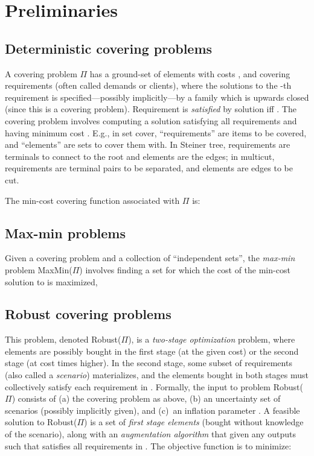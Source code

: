 \documentclass[11pt,letterpaper]{article}
\def\cov{\ensuremath{\Pi}\xspace}
\def\rcov{{\sf Robust(\cov)}\xspace}
\def\mmp{{\sf MaxMin(\cov)}\xspace}
\newcounter{note}[section]
\begin{document}
\section{Preliminaries}
\label{sec:prelim}

\subsection{Deterministic covering problems}

A covering problem \cov has a ground-set  of elements with costs , and  covering
requirements (often called demands or clients), where the solutions to the -th requirement is specified---possibly
implicitly---by a family  which is upwards closed (since this is a covering problem).
Requirement  is \emph{satisfied} by solution  iff .  The covering problem  involves computing a solution  satisfying all 
requirements and having minimum cost .  E.g., in set cover, ``requirements'' are items to be
covered, and ``elements'' are sets to cover them with. In Steiner tree, requirements are terminals to connect to the
root and elements are the edges; in multicut, requirements are terminal pairs to be separated, and elements are edges
to be cut.

The min-cost covering function associated with \cov is:


\subsection{Max-min problems} Given a covering problem  and a collection
 of ``independent sets'', the {\em max-min} problem \mmp involves finding a set 
for which the cost of the min-cost solution to  is maximized,



\subsection{Robust covering problems}
This problem, denoted \rcov, is a {\em two-stage optimization} problem, where elements are possibly bought in the first
stage (at the given cost) or the second stage (at cost  times higher). In the second stage, some subset
 of requirements (also called a \emph{scenario}) materializes, and the elements bought in both stages
must collectively satisfy each requirement in . Formally, the input to problem \rcov consists of (a) the
covering problem  as above, (b) an uncertainty set  of scenarios (possibly implicitly given), and (c)~an inflation parameter . A feasible solution
to \rcov is a set of {\em
  first stage elements}  (bought without knowledge of the
scenario), along with an {\em augmentation algorithm} that given any  outputs  such
that  satisfies all requirements in .  The objective function is  to minimize:
\end{document}
